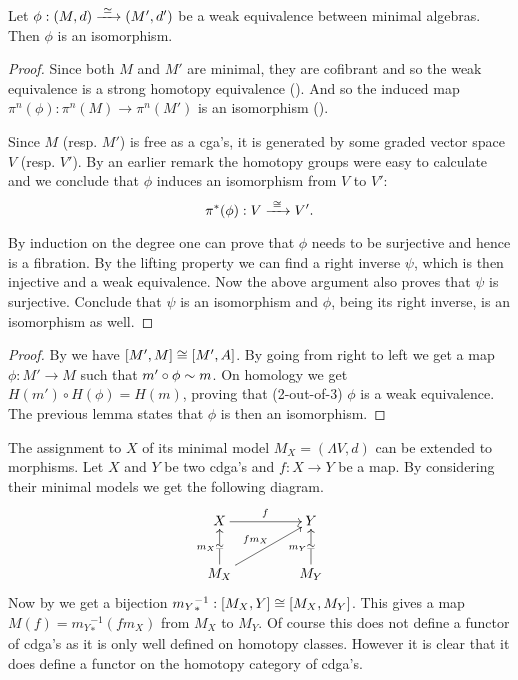 \begin{lemma}
	Let $\phi: (M, d) \xrightarrow{\,\,{\simeq}\,\,} (M', d')$ be a weak equivalence between minimal algebras. Then $\phi$ is an isomorphism.
\end{lemma}
\begin{proof}
	Since both $M$ and $M'$ are minimal, they are cofibrant and so the weak equivalence is a strong homotopy equivalence (). And so the induced map $\pi^n(\phi) : \pi^n(M) \to \pi^n(M')$ is an isomorphism ().

	Since $M$ (resp. $M'$) is free as a cga's, it is generated by some graded vector space $V$ (resp. $V'$). By an earlier remark the homotopy groups were easy to calculate and we conclude that $\phi$ induces an isomorphism from $V$ to $V'$:
	\[ \pi^\ast(\phi) : V \xrightarrow{\,\,{\cong}\,\,} V'. \]

	By induction on the degree one can prove that $\phi$ needs to be surjective and hence is a fibration. By the lifting property we can find a right inverse $\psi$, which is then injective and a weak equivalence. Now the above argument also proves that $\psi$ is surjective. Conclude that $\psi$ is an isomorphism and $\phi$, being its right inverse, is an isomorphism as well.
\end{proof}

\begin{proof}
	By  we have $[M', M] \cong [M', A]$. By going from right to left we get a map $\phi: M' \to M$ such that $m' \circ \phi \sim m$. On homology we get $H(m') \circ H(\phi) = H(m)$, proving that (2-out-of-3) $\phi$ is a weak equivalence. The previous lemma states that $\phi$ is then an isomorphism.
\end{proof}

The assignment to $X$ of its minimal model $M_X = (\Lambda V, d)$ can be extended to morphisms. Let $X$ and $Y$ be two cdga's and $f: X \to Y$ be a map. By considering their minimal models we get the following diagram.
\begin{displaymath}
	\xymatrix @C=1.5cm{
	X \ar[r]^f & Y \\
	M_X \arwe[u]^{m_X} \ar[ur]^{f m_X} & M_Y \arwe[u]^{m_Y}
	}
\end{displaymath}
Now by  we get a bijection ${m_Y}_\ast^{-1} : [M_X, Y] \cong [M_X, M_Y]$. This gives a map $M(f) = {m_Y}_\ast^{-1} (f m_X)$ from $M_X$ to $M_Y$. Of course this does not define a functor of cdga's as it is only well defined on homotopy classes. However it is clear that it does define a functor on the homotopy category of cdga's.

